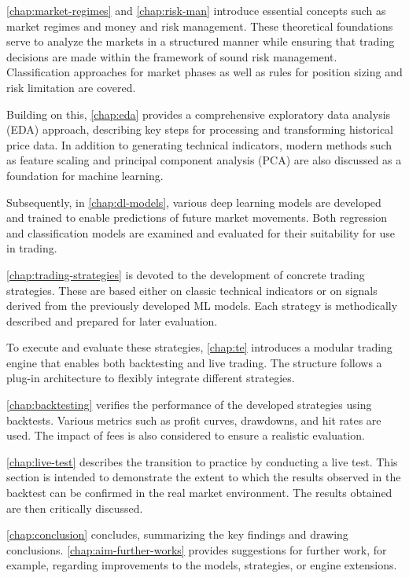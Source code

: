 \autoref{chap:market-regimes} and \autoref{chap:risk-man} introduce essential concepts such as market regimes and money and risk management.
These theoretical foundations serve to analyze the markets in a structured manner while ensuring that trading decisions are made within the framework of sound risk management.
Classification approaches for market phases as well as rules for position sizing and risk limitation are covered.


Building on this, \autoref{chap:eda} provides a comprehensive exploratory data analysis (EDA) approach, describing key steps for processing and transforming historical price data.
In addition to generating technical indicators, modern methods such as feature scaling and principal component analysis (PCA) are also discussed as a foundation for machine learning.

Subsequently, in \autoref{chap:dl-models}, various deep learning models are developed and trained to enable predictions of future market movements.
Both regression and classification models are examined and evaluated for their suitability for use in trading.

\autoref{chap:trading-strategies} is devoted to the development of concrete trading strategies.
These are based either on classic technical indicators or on signals derived from the previously developed ML models.
Each strategy is methodically described and prepared for later evaluation.

To execute and evaluate these strategies, \autoref{chap:te} introduces a modular trading engine that enables both backtesting and live trading.
The structure follows a plug-in architecture to flexibly integrate different strategies.

\autoref{chap:backtesting} verifies the performance of the developed strategies using backtests.
Various metrics such as profit curves, drawdowns, and hit rates are used.
The impact of fees is also considered to ensure a realistic evaluation.

\autoref{chap:live-test} describes the transition to practice by conducting a live test.
This section is intended to demonstrate the extent to which the results observed in the backtest can be confirmed in the real market environment.
The results obtained are then critically discussed.

\autoref{chap:conclusion} concludes, summarizing the key findings and drawing conclusions.
\autoref{chap:aim-further-works} provides suggestions for further work, for example, regarding improvements to the models, strategies, or engine extensions.